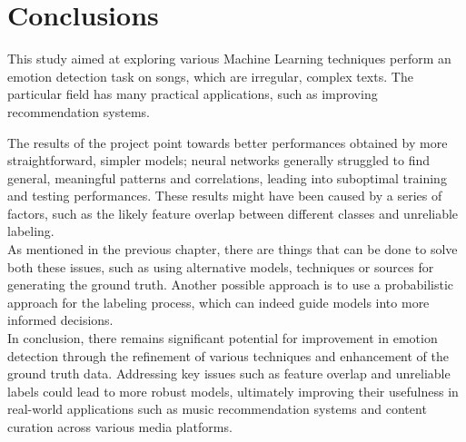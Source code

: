 \chapter*{Conclusions}
\label{ch:conclusions}
This study aimed at exploring various Machine Learning techniques perform an
emotion detection task on songs, which are irregular, complex texts.
The particular field has many practical applications, such as improving
recommendation systems.

The results of the project point towards better performances obtained by more
straightforward, simpler models; neural networks generally struggled to find
general, meaningful patterns and correlations, leading into suboptimal
training and testing performances. These results might have been caused by a
series of factors, such as the likely feature overlap between different classes and
unreliable labeling.\\

As mentioned in the previous chapter, there are things that can be done to
solve both these issues, such as using alternative models, techniques or
sources for generating the ground truth. Another possible approach
is to use a probabilistic approach for the labeling process, which
can indeed guide models into more informed decisions.\\


In conclusion, there remains significant potential for improvement in emotion
detection through the refinement of various techniques and enhancement of the
ground truth data.
Addressing key issues such as feature overlap and unreliable labels
could lead to more robust models, ultimately improving their
usefulness in real-world applications such as music recommendation systems
and content curation across various media platforms.